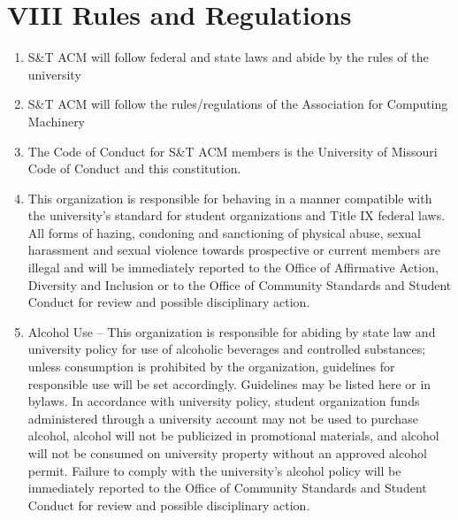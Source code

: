 
\section{VIII \textendash{} Rules and Regulations} \label{sec:rules_and_regulations}
  \begin{enumerate}
    \item S\&T ACM will follow federal and state laws and abide by the rules
    of the university
    \item S\&T ACM will follow the rules/regulations of the Association for Computing
    Machinery
    \item The Code of Conduct for S\&T ACM members is the University of
    Missouri Code of Conduct and this constitution.
    \item This organization is responsible for behaving in a manner compatible with
    the university’s standard for student organizations and Title IX federal laws.
    All forms of hazing, condoning and sanctioning of physical abuse, sexual
    harassment and sexual violence towards prospective or current members are
    illegal and will be immediately reported to the Office of Affirmative Action,
    Diversity and Inclusion or to the Office of Community Standards and Student
    Conduct for review and possible disciplinary action.
    \item Alcohol Use – This organization is responsible for abiding by state law
    and university policy for use of alcoholic beverages and controlled substances;
    unless consumption is prohibited by the organization, guidelines for responsible
    use will be set accordingly. {Guidelines may be listed here or in bylaws}. In
    accordance with university policy, student organization funds administered
    through a university account may not be used to purchase alcohol, alcohol will
    not be publicized in promotional materials, and alcohol will not be consumed on
    university property without an approved alcohol permit. Failure to comply with
    the university’s alcohol policy will be immediately reported to the Office of
    Community Standards and Student Conduct for review and possible disciplinary
    action.
  \end{enumerate}
